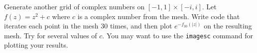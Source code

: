 \begin{problem}
Generate another grid of complex numbers on $[-1,1]\times[-i,i]$.  Let $f(z) = z^2 + c$ where $c$ is a complex number from the mesh.  Write code that iterates each point in the mesh 30 times, and then plot $e^{-f_{30}(|z|)}$ on the resulting mesh.  Try for several values of $c$.  You may want to use the {\tt imagesc} command for plotting your results.
\end{problem}




